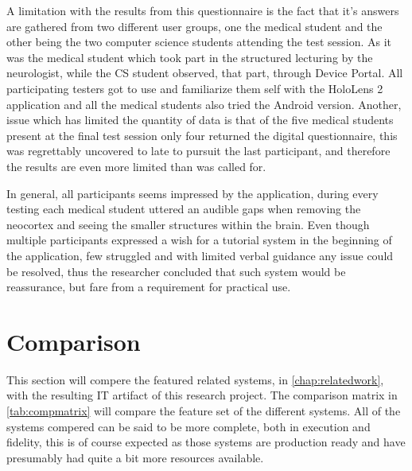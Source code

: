 
A limitation with the results from this questionnaire is the fact that it's answers are gathered from two different user groups, one the medical student and the other being the two computer science students attending the test session. As it was the medical student which took part in the structured lecturing by the neurologist, while the CS student observed, that part, through Device Portal. All participating testers got to use and familiarize them self with the HoloLens 2 application and all the medical students also tried the Android version.
Another, issue which has limited the quantity of data is that of the five medical students present at the final test session only four returned the digital questionnaire, this was regrettably uncovered to late to pursuit the last participant, and therefore the results are even more limited than was called for.

In general, all participants seems impressed by the application, during every testing each medical student uttered an audible gaps when removing the neocortex and seeing the smaller structures within the brain. Even though multiple participants expressed a wish for a tutorial system in the beginning of the application, few struggled and with limited verbal guidance any issue could be resolved, thus the researcher concluded that such system would be reassurance, but fare from a requirement for practical use. 

\section{Comparison}
This section will compere the featured related systems, in \autoref{chap:relatedwork}, with the resulting IT artifact of this research project. The comparison matrix in \autoref{tab:compmatrix} will compare the feature set of the different systems. All of the systems compered can be said to be more complete, both in execution and fidelity, this is of course expected as those systems are production ready and have presumably had quite a bit more resources available.

